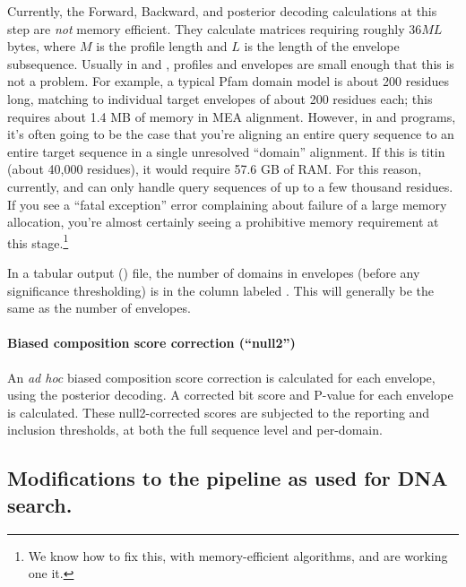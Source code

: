 Currently, the Forward, Backward, and posterior decoding calculations
at this step are \emph{not} memory efficient. They calculate matrices
requiring roughly $36 ML$ bytes, where $M$ is the profile length and
$L$ is the length of the envelope subsequence. Usually in
 and , profiles and envelopes are small
enough that this is not a problem. For example, a typical Pfam domain
model is about 200 residues long, matching to individual target
envelopes of about 200 residues each; this requires about 1.4 MB of
memory in MEA alignment. However, in  and
 programs, it's often going to be the case that you're
aligning an entire query sequence to an entire target sequence in a
single unresolved ``domain'' alignment. If this is titin (about 40,000
residues), it would require 57.6 GB of RAM. For this reason,
currently,  and  can only handle query
sequences of up to a few thousand residues. If you see a ``fatal
exception'' error complaining about failure of a large memory
allocation, you're almost certainly seeing a prohibitive memory
requirement at this stage.\footnote{We know how to fix this, with
  memory-efficient algorithms, and are working one it.}

In a tabular output () file, the number of domains in
envelopes (before any significance thresholding) is in the column
labeled . This will generally be the same as the number of
envelopes.

\paragraph{Biased composition score correction (``null2'')}
An \emph{ad hoc} biased composition score correction is calculated for
each envelope, using the posterior decoding. A corrected bit score and
P-value for each envelope is calculated. These null2-corrected scores
are subjected to the reporting and inclusion thresholds, at both the full
sequence level and per-domain.




\subsection{Modifications to the pipeline as used for DNA search.}


